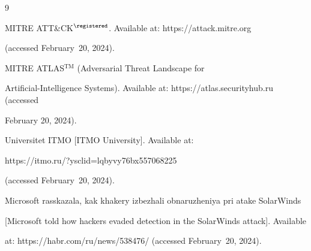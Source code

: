 














\renewcommand{\bibname}{\protect\rmfamily References}




{\small\frenchspacing

{ %


\begin{thebibliography}{9}







MITRE ATT\&CK$^\registered$. Available at: {\sf https://attack.mitre.org} 

(accessed February~20, 2024).


MITRE ATLAS$^{{\mathrm{TM}}}$ (Adversarial Threat Landscape for 

Artificial-Intelligence Systems). Available at: {\sf https://atlas.securityhub.ru} (accessed 

February 20, 2024).


Universitet ITMO [ITMO University]. Available at: {\sf 

https://itmo.ru/?ysclid=\linebreak lqbyvy76bx557068225} (accessed February~20, 2024).


Microsoft rasskazala, kak khakery izbezhali obnaruzheniya pri atake SolarWinds 

[Microsoft told how hackers evaded detection in the SolarWinds attack]. Available 

at: {\sf https://habr.com/ru/news/538476/} (accessed February~20, 2024).




\end{thebibliography}}}

